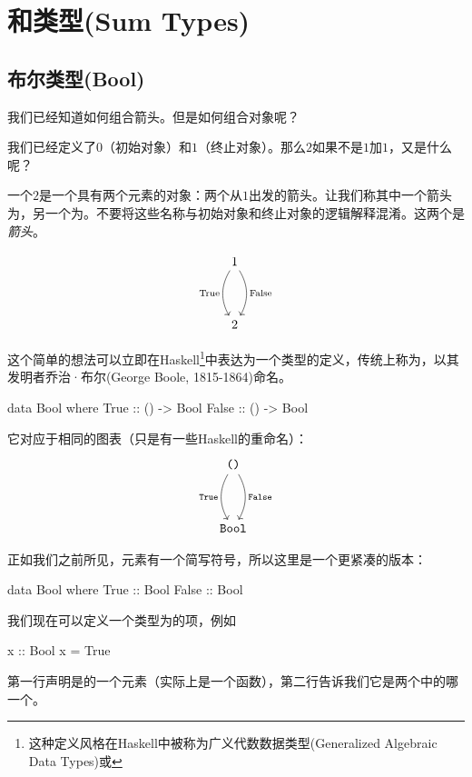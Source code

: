\documentclass[DaoFP]{subfiles}
\begin{document}
\setcounter{chapter}{3}

\chapter{和类型(Sum Types)}

\section{布尔类型(Bool)}

我们已经知道如何组合箭头。但是如何组合对象呢？

我们已经定义了$0$（初始对象）和$1$（终止对象）。那么$2$如果不是$1$加$1$，又是什么呢？

一个$2$是一个具有两个元素的对象：两个从$1$出发的箭头。让我们称其中一个箭头为，另一个为。不要将这些名称与初始对象和终止对象的逻辑解释混淆。这两个是\emph{箭头}。

\[
 \begin{tikzcd}
 1
 \arrow[dd, bend right, "\text{True}"']
 \arrow[dd, bend left, "\text{False}"]
 \\
 \\
2
 \end{tikzcd}
\]

这个简单的想法可以立即在Haskell\footnote{这种定义风格在Haskell中被称为广义代数数据类型(Generalized Algebraic Data Types)或}中表达为一个类型的定义，传统上称为，以其发明者乔治·布尔(George Boole, 1815-1864)命名。

\begin{haskell}
data Bool where
  True  :: () -> Bool
  False :: () -> Bool
\end{haskell}
它对应于相同的图表（只是有一些Haskell的重命名）：
\[
 \begin{tikzcd}
 \hask{()}
 \arrow[dd, bend right, "\hask{True}"']
 \arrow[dd, bend left, "\hask{False}"]
 \\
 \\
\hask{Bool}
 \end{tikzcd}
\]

正如我们之前所见，元素有一个简写符号，所以这里是一个更紧凑的版本：

\begin{haskell}
data Bool where
  True  :: Bool
  False :: Bool
\end{haskell}

我们现在可以定义一个类型为的项，例如
\begin{haskell}
x :: Bool
x = True
\end{haskell}
第一行声明是的一个元素（实际上是一个函数），第二行告诉我们它是两个中的哪一个。
\end{document}
